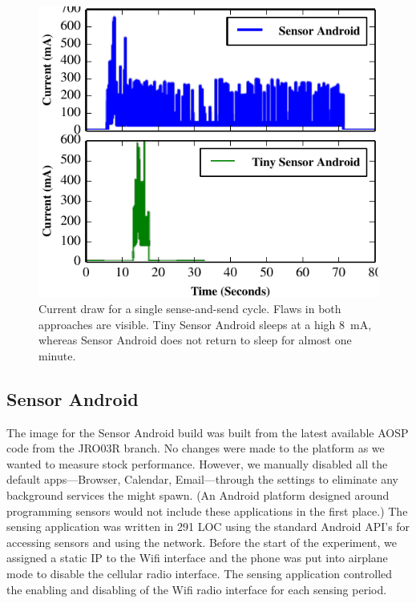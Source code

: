 \begin{figure}[t]
\includegraphics[width=\columnwidth]{./figures/traces.pdf}

\caption{\small Current draw for a single sense-and-send cycle.
\textnormal{Flaws in both approaches are visible. Tiny Sensor Android sleeps
at a high 8~mA, whereas Sensor Android does not return to sleep for almost
one minute.}}

\label{fig-traces}
\end{figure}


\subsection{Sensor Android}
\label{subsec-full}

The image for the Sensor Android build was built from the latest available
AOSP code from the JRO03R branch. No changes were made to the platform as we
wanted to measure stock performance. However, we manually disabled all the
default apps---Browser, Calendar, Email---through the settings to eliminate
any background services the might spawn. (An Android platform designed around
programming sensors would not include these applications in the first place.)
The sensing application was written in 291 LOC using the standard Android
API's for accessing sensors and using the network. Before the start of the
experiment, we assigned a static IP to the Wifi interface and the phone was
put into airplane mode to disable the cellular radio interface. The sensing
application controlled the enabling and disabling of the Wifi radio interface
for each sensing period.

